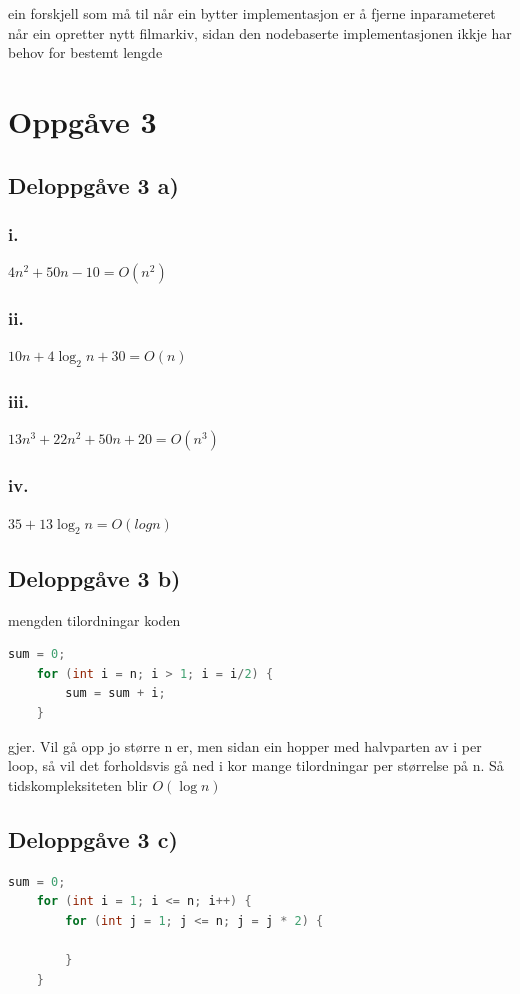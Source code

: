 \documentclass{article}
\begin{document}
ein forskjell som må til når ein bytter implementasjon er å fjerne
inparameteret når ein opretter nytt filmarkiv, sidan den nodebaserte 
implementasjonen ikkje har behov for bestemt lengde


\section{Oppgåve 3}
\subsection{Deloppgåve 3 a)}
\subsubsection*{i.}
$4n^2 + 50n - 10 = O(n^2)$
\subsubsection*{ii.}
$10n + 4 \log_2 n + 30 = O(n)$
\subsubsection*{iii.}
$13n^3 + 22n^2 + 50n + 20 = O(n^3)$
\subsubsection*{iv.}
$35 + 13 \log_2 n = O(log n)$

\subsection{Deloppgåve 3 b)}

mengden tilordningar koden

\begin{lstlisting}[language=Java]
    sum = 0;
    for (int i = n; i > 1; i = i/2) {
        sum = sum + i;
    }
\end{lstlisting}

gjer. Vil gå opp jo større n er, men sidan ein hopper med halvparten av i
per loop, så vil det forholdsvis gå ned i kor mange tilordningar per størrelse på n.
Så tidskompleksiteten blir $O(\log n)$

\subsection{Deloppgåve 3 c)}
\begin{lstlisting}[language=Java]
    sum = 0;
    for (int i = 1; i <= n; i++) {
        for (int j = 1; j <= n; j = j * 2) {
            
        }
    }
\end{lstlisting}
\end{document}
